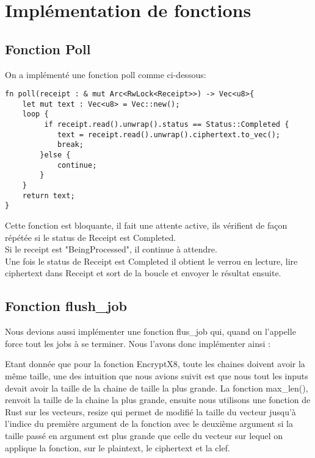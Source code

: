 \documentclass{article}
\begin{document}
\section{Implémentation de fonctions}
\subsection{Fonction Poll}
On a implémenté une fonction poll comme ci-dessous:
\begin{lstlisting}
fn poll(receipt : & mut Arc<RwLock<Receipt>>) -> Vec<u8>{
    let mut text : Vec<u8> = Vec::new();
    loop {
         if receipt.read().unwrap().status == Status::Completed {
            text = receipt.read().unwrap().ciphertext.to_vec();
            break;
        }else {
            continue;
        }
    }
    return text;
}\end{lstlisting}
Cette fonction est bloquante, il fait une attente active, ils vérifient de façon répétée si le status de Receipt est Completed.\\
Si le receipt est "BeingProcessed", il continue à attendre.\\
Une fois le status de Receipt est Completed il obtient le verrou en lecture, lire ciphertext dans Receipt et sort de la boucle et envoyer le résultat ensuite.



\subsection{Fonction flush\_job}
Nous devions aussi implémenter une fonction flus\_job qui, quand on l'appelle force tout les jobs à se terminer. Nous l'avons donc implémenter ainsi :


Etant donnée que pour la fonction EncryptX8, toute les chaines doivent avoir la même taille, une des intuition que nous avions suivit est que nous tout les inputs devait avoir la taille de la chaine de taille la plus grande. La fonction max\_len(), renvoit la taille de la chaine la plus grande, ensuite nous utilisons une fonction de Rust sur les vecteurs, resize qui permet de modifié la taille du vecteur jusqu'à l'indice du première argument de la fonction avec le deuxième argument si la taille passé en argument est plus grande que celle du vecteur sur lequel on applique la fonction, sur le plaintext, le ciphertext et la clef.\\
\end{document}
